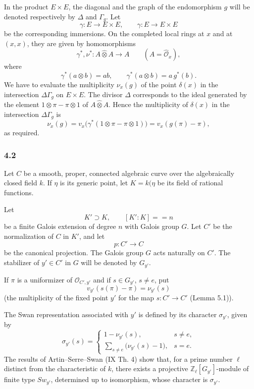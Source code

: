 \documentclass[11pt]{article}
\begin{document}
In the product $E\times E$, the diagonal and the graph of the endomorphism $g$ will be denoted respectively by $\Delta$ and $\Gamma_g$. Let
\[
\gamma:E\longrightarrow E\times E,\qquad
\gamma:E\longrightarrow E\times E
\]
be the corresponding immersions. On the completed local rings at $x$ and at $(x,x)$, they are given by homomorphisms
\[
\gamma^*,\nu^*:A\widehat\otimes A\longrightarrow A
\qquad (A=\widehat{\mathcal O}_x),
\]
where
\[
\gamma^*(a\otimes b)=ab,\qquad
\gamma^*(a\otimes b)=a\,g^*(b).
\]
We have to evaluate the multiplicity $\nu_x(g)$ of the point $\delta(x)$ in the intersection $\Delta\Gamma_g$ on $E\times E$. The divisor $\Delta$ corresponds to the ideal generated by the element $1\otimes\pi-\pi\otimes1$ of $A\widehat\otimes A$. Hence the multiplicity of $\delta(x)$ in the intersection $\Delta\Gamma_g$ is
\[
\nu_x(g)=v_x\bigl(\gamma^*(1\otimes\pi-\pi\otimes1)\bigr)
      =v_x(g(\pi)-\pi),
\]
as required.

\subsubsection*{4.2}

Let $C$ be a smooth, proper, connected algebraic curve over the algebraically closed field $k$. If $\eta$ is its generic point, let $K=k(\eta$ be its field of rational functions.

Let
\[
K'\supset K,\qquad [K':K]==n
\]
be a finite Galois extension of degree $n$ with Galois group $G$. Let $C'$ be the normalization of $C$ in $K'$, and let
\[
p:C'\longrightarrow C
\]
be the canonical projection. The Galois group $G$ acts naturally on $C'$. The stabilizer of $y'\in C'$ in $G$ will be denoted by $G_{y'}$.

If $\pi$ is a uniformizer of $\mathcal O_{C',y'}$ and if $s\in G_{y'}$, $s\ne e$, put
\[
v_{y'}(s(\pi)-\pi)=\nu_{y'}(s)
\tag{4.2.1}
\]
(the multiplicity of the fixed point $y'$ for the map $s:C'\to C'$ (Lemma 5.1)).

The Swan representation associated with $y'$ is defined by its character $\sigma_{y'}$, given by
\[
\sigma_{y'}(s)=
\begin{cases}
1-\nu_{y'}(s),& s\ne e,\\[0.4em]
\displaystyle\sum_{s\ne e}\bigl(\nu_{y'}(s)-1\bigr),& s=e.
\end{cases}
\tag{4.2.2}
\]
The results of Artin--Serre--Swan (IX Th. 4) show that, for a prime number $\ell$ distinct from the characteristic of $k$, there exists a projective $\mathbb Z_\ell[G_{y'}]$-module of finite type $Sw_{y'}$, determined up to isomorphism, whose character is $\sigma_{y'}$.
\end{document}

